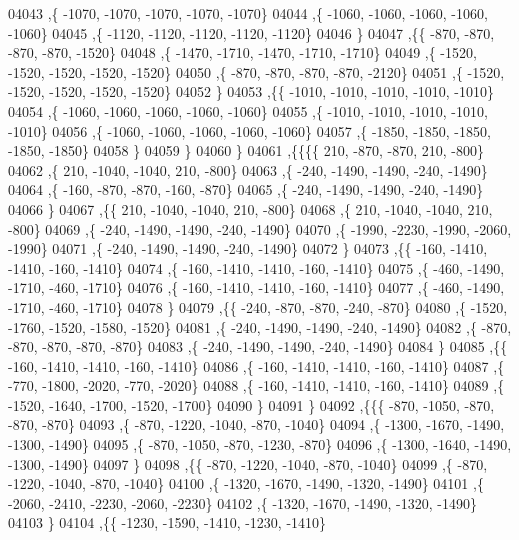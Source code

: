 \begin{DoxyCode}
04043     ,\{ -1070, -1070, -1070, -1070, -1070\}
04044     ,\{ -1060, -1060, -1060, -1060, -1060\}
04045     ,\{ -1120, -1120, -1120, -1120, -1120\}
04046     \}
04047    ,\{\{  -870,  -870,  -870,  -870, -1520\}
04048     ,\{ -1470, -1710, -1470, -1710, -1710\}
04049     ,\{ -1520, -1520, -1520, -1520, -1520\}
04050     ,\{  -870,  -870,  -870,  -870, -2120\}
04051     ,\{ -1520, -1520, -1520, -1520, -1520\}
04052     \}
04053    ,\{\{ -1010, -1010, -1010, -1010, -1010\}
04054     ,\{ -1060, -1060, -1060, -1060, -1060\}
04055     ,\{ -1010, -1010, -1010, -1010, -1010\}
04056     ,\{ -1060, -1060, -1060, -1060, -1060\}
04057     ,\{ -1850, -1850, -1850, -1850, -1850\}
04058     \}
04059    \}
04060   \}
04061  ,\{\{\{\{   210,  -870,  -870,   210,  -800\}
04062     ,\{   210, -1040, -1040,   210,  -800\}
04063     ,\{  -240, -1490, -1490,  -240, -1490\}
04064     ,\{  -160,  -870,  -870,  -160,  -870\}
04065     ,\{  -240, -1490, -1490,  -240, -1490\}
04066     \}
04067    ,\{\{   210, -1040, -1040,   210,  -800\}
04068     ,\{   210, -1040, -1040,   210,  -800\}
04069     ,\{  -240, -1490, -1490,  -240, -1490\}
04070     ,\{ -1990, -2230, -1990, -2060, -1990\}
04071     ,\{  -240, -1490, -1490,  -240, -1490\}
04072     \}
04073    ,\{\{  -160, -1410, -1410,  -160, -1410\}
04074     ,\{  -160, -1410, -1410,  -160, -1410\}
04075     ,\{  -460, -1490, -1710,  -460, -1710\}
04076     ,\{  -160, -1410, -1410,  -160, -1410\}
04077     ,\{  -460, -1490, -1710,  -460, -1710\}
04078     \}
04079    ,\{\{  -240,  -870,  -870,  -240,  -870\}
04080     ,\{ -1520, -1760, -1520, -1580, -1520\}
04081     ,\{  -240, -1490, -1490,  -240, -1490\}
04082     ,\{  -870,  -870,  -870,  -870,  -870\}
04083     ,\{  -240, -1490, -1490,  -240, -1490\}
04084     \}
04085    ,\{\{  -160, -1410, -1410,  -160, -1410\}
04086     ,\{  -160, -1410, -1410,  -160, -1410\}
04087     ,\{  -770, -1800, -2020,  -770, -2020\}
04088     ,\{  -160, -1410, -1410,  -160, -1410\}
04089     ,\{ -1520, -1640, -1700, -1520, -1700\}
04090     \}
04091    \}
04092   ,\{\{\{  -870, -1050,  -870,  -870,  -870\}
04093     ,\{  -870, -1220, -1040,  -870, -1040\}
04094     ,\{ -1300, -1670, -1490, -1300, -1490\}
04095     ,\{  -870, -1050,  -870, -1230,  -870\}
04096     ,\{ -1300, -1640, -1490, -1300, -1490\}
04097     \}
04098    ,\{\{  -870, -1220, -1040,  -870, -1040\}
04099     ,\{  -870, -1220, -1040,  -870, -1040\}
04100     ,\{ -1320, -1670, -1490, -1320, -1490\}
04101     ,\{ -2060, -2410, -2230, -2060, -2230\}
04102     ,\{ -1320, -1670, -1490, -1320, -1490\}
04103     \}
04104    ,\{\{ -1230, -1590, -1410, -1230, -1410\}

\end{DoxyCode}
